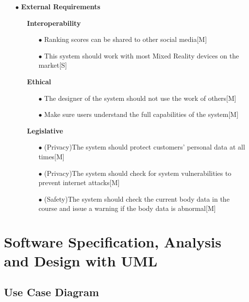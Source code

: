 \documentclass[a4paper]{article}
\begin{document}
	\begin{itemize}
		\item[$\bullet$] {\large\textbf{External Requirements}}
		\begin{itemize}
			\item[] \textbf{Interoperability}
			\begin{itemize}
				\item[$\bullet$] Ranking scores can be shared to other social media\hfill[M]
				\item[$\bullet$] This system should work with most Mixed Reality devices on the market\hfill[S]			
			\end{itemize}
		\end{itemize}
		\begin{itemize}
			\item[] \textbf{Ethical}
			\begin{itemize}
				\item[$\bullet$] The designer of the system should not use the work of others\hfill[M]
				\item[$\bullet$] Make sure users understand the full capabilities of the system\hfill[M]		
			\end{itemize}
		\end{itemize}
		\begin{itemize}
			\item[] \textbf{Legislative}
			\begin{itemize}
				\item[$\bullet$] {\footnotesize(Privacy)}The system should protect customers' personal data at all times\hfill[M]
				\item[$\bullet$] {\footnotesize(Privacy)}The system should check for system vulnerabilities to prevent internet attacks\hfill[M]
				\item[$\bullet$] {\footnotesize(Safety)}The system should check the current body data in the course and issue a warning if the body data is abnormal\hfill[M]
			\end{itemize}
		\end{itemize}
	\end{itemize}
	
    \section{Software Specification, Analysis and Design with UML}
	
	\subsection{Use Case Diagram}
\end{document}
